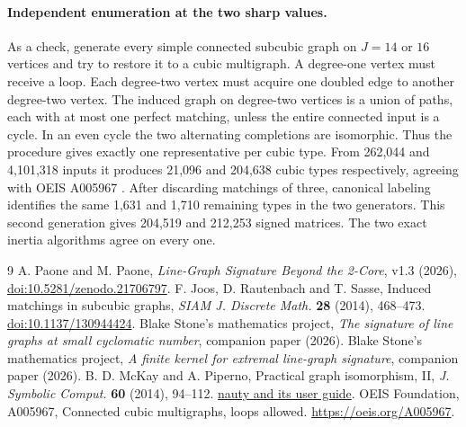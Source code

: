 \documentclass[11pt]{article}
\begin{document}
\paragraph{Independent enumeration at the two sharp values.}
As a check, generate every simple connected subcubic graph on $J=14$ or $16$ vertices and try to restore it to a cubic multigraph. A degree-one vertex must receive a loop. Each degree-two vertex must acquire one doubled edge to another degree-two vertex. The induced graph on degree-two vertices is a union of paths, each with at most one perfect matching, unless the entire connected input is a cycle. In an even cycle the two alternating completions are isomorphic. Thus the procedure gives exactly one representative per cubic type. From 262,044 and 4,101,318 inputs it produces 21,096 and 204,638 cubic types respectively, agreeing with OEIS A005967 \cite{OEIS}. After discarding matchings of three, canonical labeling identifies the same 1,631 and 1,710 remaining types in the two generators. This second generation gives 204,519 and 212,253 signed matrices. The two exact inertia algorithms agree on every one.

\begin{thebibliography}{9}
 A. Paone and M. Paone, \emph{Line-Graph Signature Beyond the 2-Core}, v1.3 (2026), \href{https://doi.org/10.5281/zenodo.21706797}{doi:10.5281/zenodo.21706797}.
 F. Joos, D. Rautenbach and T. Sasse, Induced matchings in subcubic graphs, \emph{SIAM J. Discrete Math.} \textbf{28} (2014), 468--473. \href{https://doi.org/10.1137/130944424}{doi:10.1137/130944424}.
 Blake Stone's mathematics project, \emph{The signature of line graphs at small cyclomatic number}, companion paper (2026).
 Blake Stone's mathematics project, \emph{A finite kernel for extremal line-graph signature}, companion paper (2026).
 B. D. McKay and A. Piperno, Practical graph isomorphism, II, \emph{J. Symbolic Comput.} \textbf{60} (2014), 94--112. \href{https://pallini.di.uniroma1.it/}{nauty and its user guide}.
 OEIS Foundation, A005967, Connected cubic multigraphs, loops allowed. \url{https://oeis.org/A005967}.
\end{thebibliography}
\end{document}
